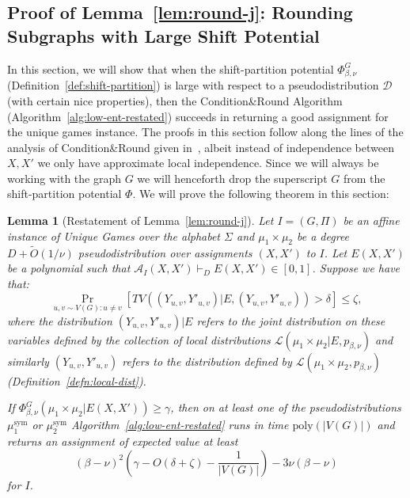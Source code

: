 \documentclass[11pt]{article}
\def \cA {\mathcal{A}}
\def \cD {\mathcal{D}}
\def \cL {\mathcal{L}}
\def \sym {\text{sym}}
\def \poly {\mathrm{poly}}
\newtheorem{lemma}[theorem]{Lemma}
\theoremstyle{definition}
\begin{document}
\subsection{Proof of Lemma~\ref{lem:round-j}: Rounding Subgraphs with Large Shift Potential}
\label{sec:low-ent-j}
In this section, we will show that when the shift-partition potential $\Phi^G_{\beta,\nu}$ (Definition~\ref{def:shift-partition}) is large with respect to a pseudodistribution $\cD$ (with certain nice properties), then the Condition\&Round Algorithm  (Algorithm~\ref{alg:low-ent-restated}) succeeds in returning a good assignment for the unique games instance. The proofs in this section follow along the lines of the analysis of Condition\&Round given in~\cite{BBKSS}, albeit instead of independence between $X,X'$ we only have approximate local independence. Since we will always be working with the graph $G$ we will henceforth drop the superscript $G$ from the shift-partition potential $\Phi$.
We will prove the following theorem in this section:

\begin{lemma}[Restatement of Lemma~\ref{lem:round-j}]\label{thm:round-j}
Let $I = (G, \Pi)$ be an affine instance of Unique Games over the alphabet $\Sigma$ and $\mu_1 \times \mu_2$ be a degree $D+\widetilde{O}(1/\nu)$ pseudodistribution over assignments $(X,X')$ to $I$. Let $E(X,X')$ be a polynomial such that $\cA_I(X,X') \vdash_D E(X,X') \in [0,1]$. Suppose we have that: 
\[\Pr_{u,v \sim V(G): u \neq v}[TV((Y_{u,v},Y'_{u,v})|E , (Y_{u,v},Y'_{u,v})) > \delta] \leq \zeta,\]
where the distribution $(Y_{u,v},Y'_{u,v})|E$ refers to the joint distribution on these variables defined by the collection of local distributions $\cL(\mu_1 \times \mu_2|E, p_{\beta,\nu})$ and similarly $(Y_{u,v},Y'_{u,v})$ refers to the distribution defined by $\cL(\mu_1 \times \mu_2,p_{\beta,\nu})$ (Definition~\ref{defn:local-dist}). 

If $\Phi^G_{\beta,\nu}(\mu_1 \times \mu_2 | E(X,X')) \geq \gamma$, then on at least one of the pseudodistributions $\mu^\sym_1$ or $\mu^\sym_2$ Algorithm~\ref{alg:low-ent-restated} runs in time $\poly(|V(G)|)$ and returns an assignment of expected value at least 
\[
(\beta - \nu)^2\left(\gamma - O(\delta+\zeta) - \frac{1}{|V(G)|}\right) - 3\nu(\beta - \nu)
\]
for $I$.
\end{lemma}

\end{document}
